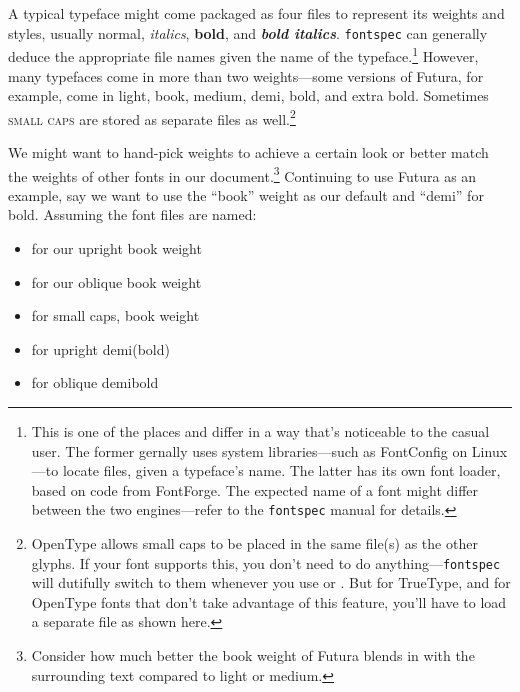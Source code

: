 A typical typeface might come packaged as four files to represent its
weights and styles, usually
normal,
\textit{italics},
\textbf{bold}, and
\textit{\textbf{bold italics}}.
\texttt{fontspec} can generally deduce the appropriate file
names given the name of the typeface.\punckern\footnote{This is
one of the places \XeLaTeX{} and \LuaLaTeX{}
differ in a way that's noticeable to the casual user.
The former gernally uses system libraries---such as FontConfig on Linux---to
locate files, given a typeface's name.
The latter has its own font loader,
based on code from FontForge.\punckern{}
The expected name of a font might differ between the two engines---refer
to the \texttt{fontspec} manual for details.}
However, many typefaces come in more than two weights---some versions of Futura,
for example, come in
{light},
{book},
{medium},
{demi},
{bold}, and
{extra bold}.
Sometimes
{\textsc{small caps}}
are stored as separate files as well.\punckern\footnote{OpenType allows
small caps to be placed in the same file(s) as the other glyphs.
If your font supports this, you don't need to do anything---\texttt{fontspec}
will dutifully switch to them whenever you use
 or .
But for TrueType, and for OpenType fonts that don't take advantage of this
feature, you'll have to load a separate file as shown here.}

We might want to hand-pick weights to achieve a certain look or better match the
weights of other fonts in our document.\punckern\footnote{Consider how much
better {the book weight} of Futura
blends in with the surrounding text compared to
{light}
or
{medium}.}
Continuing to use Futura as an example,
say we want to use the ``book'' weight as our default
and ``demi'' for bold.
Assuming the font files are named:
\begin{itemize}
\item {} for our
    {upright book weight}
\item {} for our
    {oblique book weight}
\item {} for
    {small caps, book weight}
\item {} for
    {upright demi(bold)}
\item {} for
    {oblique demibold}
\end{itemize}

